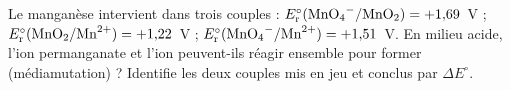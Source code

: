 \documentclass[11pt,a4paper]{article}
\begin{document}
\begin{exo}
Le manganèse intervient dans trois couples : $E_{\mathrm{r}}^{\circ}(\ce{MnO4^-}/\ce{MnO2})
=+1{,}69$~V ; $E_{\mathrm{r}}^{\circ}(\ce{MnO2}/\ce{Mn^{2+}})=+1{,}22$~V ;
$E_{\mathrm{r}}^{\circ}(\ce{MnO4^-}/\ce{Mn^{2+}})=+1{,}51$~V. En milieu acide, l'ion permanganate
 et l'ion  peuvent-ils réagir ensemble pour former 
(médiamutation) ? Identifie les deux couples mis en jeu et conclus par $\Delta E^{\circ}$.
\end{exo}
\end{document}
